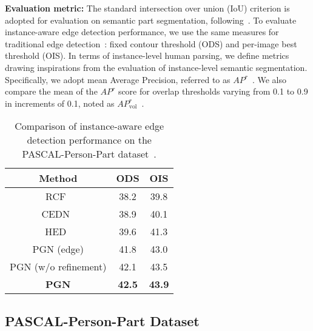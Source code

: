\documentclass[runningheads]{llncs}
\begin{document}
\textbf{Evaluation metric:}
The standard intersection over union (IoU) criterion is adopted for evaluation on semantic part segmentation, following~\cite{chen2014detect}. To evaluate instance-aware edge detection performance, we use the same measures for traditional edge detection~\cite{Liu_2017_CVPR}: fixed contour threshold (ODS) and per-image best threshold (OIS). In terms of instance-level human parsing, we define metrics drawing inspirations from the evaluation of instance-level semantic segmentation. Specifically, we adopt mean Average Precision, referred to as $AP^r$~\cite{hariharan2014simultaneous}. We also compare the mean of the $AP^r$ score for overlap thresholds varying from 0.1 to 0.9 in increments of 0.1, noted as $AP^r_\text{vol}$~\cite{li2017holistic}.





\begin{table}[t]
\centering
\small
\caption{Comparison of instance-aware edge detection performance on the PASCAL-Person-Part dataset~\cite{chen2014detect}.}
\tabcolsep 0.25in 
\begin{tabular}{ccc}
\toprule[0.7pt]
   Method                                       & ODS            & OIS   \\ \hline 
   RCF~\cite{Liu_2017_CVPR}                     & 38.2           & 39.8   \\
   CEDN~\cite{yang2016object}                   & 38.9           & 40.1      \\ 
   HED~\cite{xie2015holistically}               & 39.6           & 41.3    \\  \hline
   PGN (edge)                                   & 41.8           & 43.0         \\
   PGN (w/o refinement)                         & 42.1           & 43.5         \\  \hline
   \textbf{PGN}                                 & \textbf{42.5}  & \textbf{43.9}      \\
\toprule[0.7pt]
\end{tabular}
\vspace{-8mm}
\label{tab: edge_result}
\end{table}





\subsection{PASCAL-Person-Part Dataset}
\end{document}
